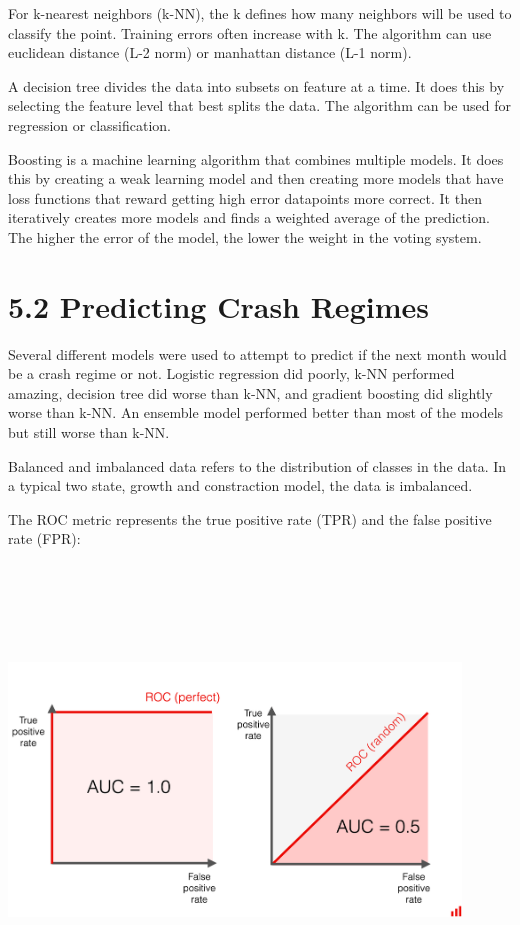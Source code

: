 \documentclass{article}
\begin{document}
For k-nearest neighbors (k-NN), the k defines how many neighbors
will be used to classify the point. Training errors often increase
with k. The algorithm can use euclidean distance (L-2 norm)
or manhattan distance (L-1 norm). 

A decision tree divides the data into subsets on feature at a time.
It does this by selecting the feature level that best splits
the data. The algorithm can be used for regression or classification.

Boosting is a machine learning algorithm that combines multiple
models. It does this by creating a weak learning model and then
creating more models that have loss functions that reward
getting high error datapoints more correct. It then iteratively 
creates more models and finds a weighted average of the prediction.
The higher the error of the model, the lower the weight in the voting
system. 

\section*{5.2 Predicting Crash Regimes}

Several different models were used to attempt to predict
if the next month would be a crash regime or not. Logistic regression
did poorly, k-NN performed amazing, decision tree did worse than k-NN, and
gradient boosting did slightly worse than k-NN. An ensemble model
performed better than most of the models but still worse than k-NN.

Balanced and imbalanced data refers to the distribution of classes
in the data. In a typical two state, growth and constraction model, 
the data is imbalanced. 

The ROC metric represents the true positive rate (TPR) and
the false positive rate (FPR):        
\begin{center}
    \includegraphics[width=12cm,height=12cm, keepaspectratio]{ROCmetric.png}
\end{center}

\begin{center}
    
\end{center}
\end{document}
